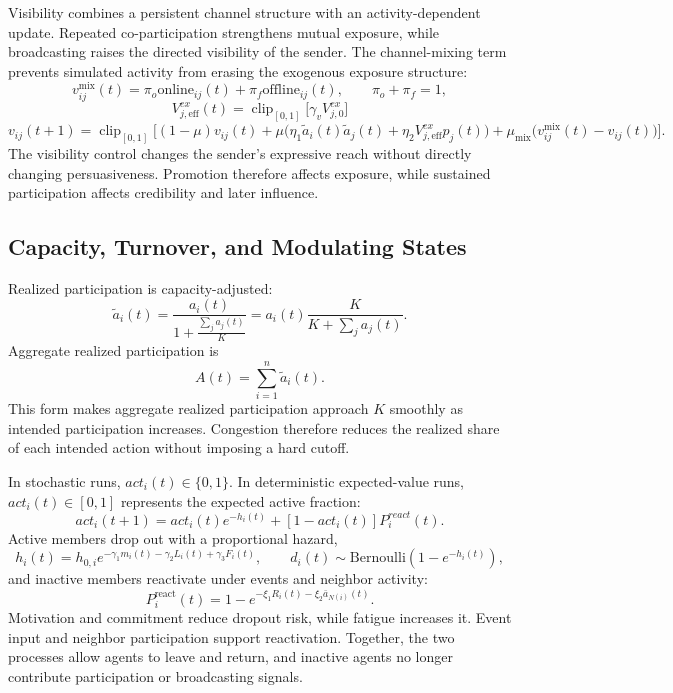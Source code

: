 \documentclass[11pt]{article}
\newcommand{\clip}{\operatorname{clip}_{[0,1]}}
\begin{document}
Visibility combines a persistent channel structure with an activity-dependent update. Repeated co-participation strengthens mutual exposure, while broadcasting raises the directed visibility of the sender. The channel-mixing term prevents simulated activity from erasing the exogenous exposure structure:
\begin{equation}\tag{12}\label{eq:vmix}
v_{ij}^{\mathrm{mix}}(t)=\pi_o\mathrm{online}_{ij}(t)+\pi_f\mathrm{offline}_{ij}(t),\qquad \pi_o+\pi_f=1,
\end{equation}
\[
V_{j,\text{eff}}^{ex}(t)=\clip\big[\gamma_vV_{j,0}^{ex}\big]
\]
\begin{equation}\tag{13}\label{eq:vupdate}
v_{ij}(t{+}1)=\clip\!\Big[(1-\mu)v_{ij}(t)+\mu\big(\eta_1\tilde a_i(t)\tilde a_j(t)+\eta_2V^{ex}_{j,\text{eff}}p_j(t)\big)+\mu_{\mathrm{mix}}\big(v_{ij}^{\mathrm{mix}}(t)-v_{ij}(t)\big)\Big].
\end{equation}
The visibility control changes the sender’s expressive reach without directly changing persuasiveness. Promotion therefore affects exposure, while sustained participation affects credibility and later influence.

\subsection{Capacity, Turnover, and Modulating States}
Realized participation is capacity-adjusted: 
\[
\widetilde{a}_i(t)=\frac{a_i(t)}{1+\frac{\sum_ja_j(t)}{K}}=a_i(t)\frac{K}{K+\sum_ja_j(t)}.
\tag{14}
\]
Aggregate realized participation is
\[
A(t)=\sum_{i=1}^n\tilde{a}_i(t).
\]
This form makes aggregate realized participation approach $K$ smoothly as intended participation increases. Congestion therefore reduces the realized share of each intended action without imposing a hard cutoff. 

In stochastic runs, $act_i(t)\in\{0,1\}$.  In deterministic expected-value runs, $act_i(t)\in[0,1]$ represents the expected active fraction:
\[
act_i(t+1)=act_i(t)e^{-h_i(t)}+[1-act_i(t)]P_i^{react}(t).
\]
Active members drop out with a proportional hazard,
\begin{equation}\tag{15}\label{eq:hazard}
h_i(t)=h_{0,i}e^{-\gamma_1m_i(t)-\gamma_2L_i(t)+\gamma_3F_i(t)},\qquad d_i(t)\sim\mathrm{Bernoulli}(1-e^{-h_i(t)}),
\end{equation}
and inactive members reactivate under events and neighbor activity:
\begin{equation}\tag{16}\label{eq:react}
P_i^{\mathrm{react}}(t)=1-e^{-\xi_1R_i(t)-\xi_2\bar a_{N(i)}(t)}.
\end{equation}
Motivation and commitment reduce dropout risk, while fatigue increases it. Event input and neighbor participation support reactivation. Together, the two processes allow agents to leave and return, and inactive agents no longer contribute participation or broadcasting signals. 
\end{document}
